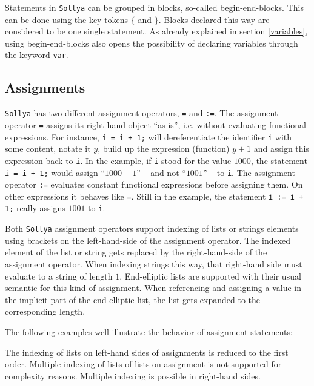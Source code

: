\documentclass[a4paper]{article}
\newcommand{\key}[1]{\texttt{#1}}
\newcommand{\sollya}{\texttt{Sollya}\xspace}
\begin{document}
Statements in \sollya can be grouped in blocks, so-called
begin-end-blocks.  This can be done using the key tokens \key{$\lbrace$} and
\key{$\rbrace$}. Blocks declared this way are considered to be one single
statement. As already explained in section \ref{variables}, using
begin-end-blocks also opens the possibility of declaring variables
through the keyword \key{var}. 

\subsection{Assignments}

\sollya has two different assignment operators, \texttt{=} and
\texttt{:=}. The assignment operator \texttt{=} assigns its
right-hand-object ``as is'', i.e. without evaluating functional
expressions. For instance, \texttt{i = i + 1;} will dereferentiate the
identifier \texttt{i} with some content, notate it $y$, build up the
expression (function) $y + 1$ and assign this expression back to
\texttt{i}. In the example, if \texttt{i} stood for the value $1000$,
the statement \texttt{i = i + 1;} would assign ``$1000 + 1$'' -- and not
``$1001$'' -- to \texttt{i}. The assignment operator \texttt{:=} evaluates
constant functional expressions before assigning them. On other
expressions it behaves like \texttt{=}. Still in the example, the
statement \texttt{i := i + 1;} really assigns $1001$ to \texttt{i}.

Both \sollya assignment operators support indexing of lists or strings
elements using brackets on the left-hand-side of the assignment
operator. The indexed element of the list or string gets replaced by
the right-hand-side of the assignment operator.  When indexing strings
this way, that right-hand side must evaluate to a string of length
$1$. End-elliptic lists are supported with their usual semantic for
this kind of assignment.  When referencing and assigning a value in
the implicit part of the end-elliptic list, the list gets expanded to
the corresponding length.

The following examples well illustrate the behavior of assignment
statements:




The indexing of lists on left-hand sides of assignments is reduced to
the first order. Multiple indexing of lists of lists on assignment is
not supported for complexity reasons. Multiple indexing is possible in
right-hand sides.


\end{document}
